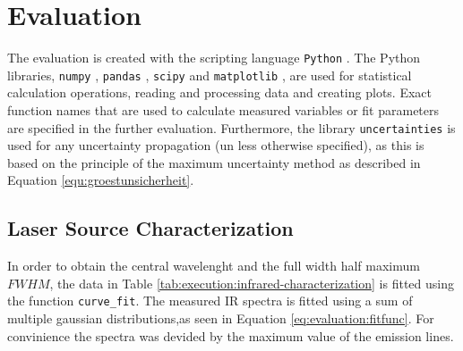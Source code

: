 \section{Evaluation}
\label{sec:evaluation}
The evaluation is created with the scripting language \verb|Python| \cite{PYTHON}.
The Python libraries, \verb|numpy| \cite{harris2020array}, \verb|pandas| \cite{reback2020pandas}, \verb|scipy| \cite{2020SciPy-NMeth} and \verb|matplotlib| \cite{Hunter:2007}, are used for statistical calculation operations, reading and processing data and creating plots.
Exact function names that are used to calculate measured variables or fit parameters are specified in the further evaluation.
Furthermore, the library \verb|uncertainties| \cite{UN} is used for any uncertainty propagation (un less otherwise specified), as this is based on the principle of the maximum uncertainty method as described in Equation \ref{equ:groestunsicherheit}.
\subsection{Laser Source Characterization}
In order to obtain the central wavelenght and the full width half maximum $FWHM$, the data in Table \ref{tab:execution:infrared-characterization} is fitted using the function \verb|curve_fit|.
The measured IR spectra is fitted using a sum of multiple gaussian distributions,as seen in Equation \ref{eq:evaluation:fitfunc}.
For convinience the spectra was devided by the maximum value of the emission lines. 

